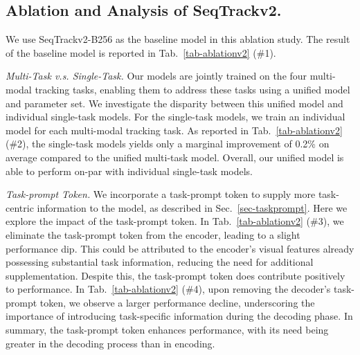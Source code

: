 \subsection{Ablation and Analysis of SeqTrackv2. }
\label{subsec:ablationv2}

We use SeqTrackv2-B256 as the baseline model in this ablation study. The result of the baseline model is reported in Tab.~\ref{tab-ablationv2} (\#1).

\textit{Multi-Task v.s. Single-Task.}
Our models are jointly trained on the four multi-modal tracking tasks, enabling them to address these tasks using a unified model and parameter set. We investigate the disparity between this unified model and individual single-task models. For the single-task models, we train an individual model for each multi-modal tracking task. As reported in Tab.~\ref{tab-ablationv2} (\#2), the single-task models yields only a marginal improvement of 0.2\% on average compared to the unified multi-task model. Overall, our unified model is able to perform on-par with individual single-task models. 

\textit{Task-prompt Token.}
We incorporate a task-prompt token to supply more task-centric information to the model, as described in Sec.~\ref{sec-taskprompt}. Here we explore the impact of the task-prompt token. 
In Tab.~\ref{tab-ablationv2} (\#3), we eliminate the task-prompt token from the encoder, leading to a slight performance dip. This could be attributed to the encoder's visual features already possessing substantial task information, reducing the need for additional supplementation. Despite this, the task-prompt token does contribute positively to performance. In Tab.~\ref{tab-ablationv2} (\#4), upon removing the decoder's task-prompt token, we observe a larger performance decline, underscoring the importance of introducing task-specific information during the decoding phase.
In summary, the task-prompt token enhances performance, with its need being greater in the decoding process than in encoding.

\begin{table}[t]\normalsize
\centering
  \caption{Ablation study of the low-rank dimension. Avg. denotes the performance averaged over benchmarks. The baseline setting is marked in \colorbox{gray!15}{gray}.}
  \label{tab-ablation_d}
    \vspace{-2mm}
  \vspace{-3mm}
\end{table}

